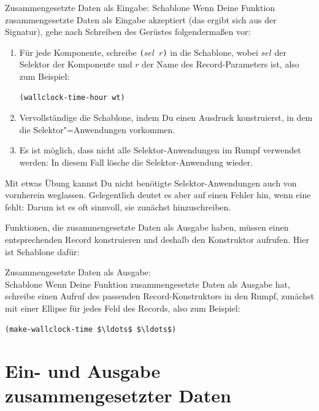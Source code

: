 \begin{konstruktionsanleitung}{Zusammengesetzte Daten als Eingabe:
    Schablone}
  \label{ka:zusammengesetzt-eingabe-schablone}
  Wenn Deine Funktion zusammengesetzte Daten als Eingabe akzeptiert
  (das ergibt sich aus der Signatur), gehe nach Schreiben des Gerüstes
  folgendermaßen vor:
%
\begin{enumerate}
\item Für jede Komponente, schreibe  \texttt{($\mathit{sel}$ $r$)} in die
  Schablone, wobei $\mathit{sel}$ der Selektor der Komponente und $r$ der Name
  des Record-Parameters ist, also zum Beispiel:
\begin{lstlisting}
(wallclock-time-hour wt)
\end{lstlisting}
\item Vervollständige die Schablone, indem Du einen Ausdruck
  konstruierst, in dem die Selektor"=Anwendungen vorkommen.
\item Es ist möglich, dass nicht alle Selektor-Anwendungen im Rumpf
  verwendet werden: In diesem Fall lösche die Selektor-Anwendung
  wieder.
\end{enumerate}
%
\end{konstruktionsanleitung}
%
Mit etwas Übung kannst Du nicht benötigte Selektor-Anwendungen auch von
vornherein weglassen.  Gelegentlich deutet es aber auf einen Fehler
hin, wenn eine fehlt: Darum ist es oft sinnvoll, sie zunächst
hinzuschreiben.

\noindent Funktionen, die zusammengesetzte Daten als Ausgabe haben, müssen einen
entsprechenden Record konstruieren und deshalb den Konstruktor
aufrufen.  Hier ist Schablone dafür:
%
\begin{konstruktionsanleitung}{Zusammengesetzte Daten als Ausgabe:\\
    Schablone}
    \label{ka:zusammengesetzt-ausgabe-schablone}
  Wenn Deine Funktion zusammengesetzte Daten als Ausgabe hat, schreibe
  einen Aufruf des passenden Record-Konstruktors in den Rumpf,
  zunächst mit einer Ellipse für jedes Feld des Records, also zum
  Beispiel:
\begin{lstlisting}
(make-wallclock-time $\ldots$ $\ldots$)
\end{lstlisting}

\end{konstruktionsanleitung}

\section{Ein- und Ausgabe zusammengesetzter Daten}
\label{sec:armadillo}

